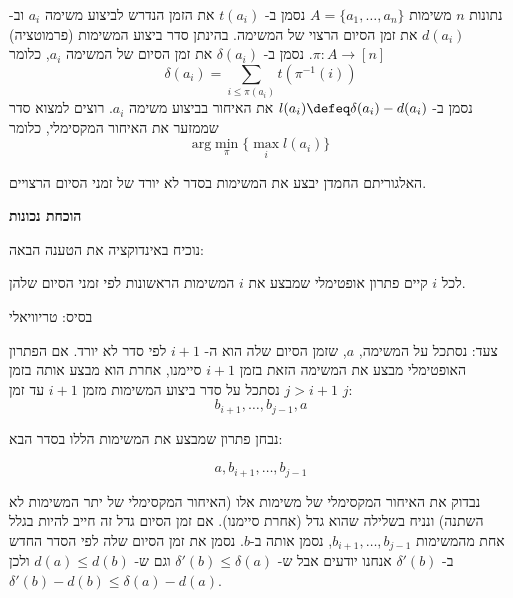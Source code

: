 נתונות $n$ משימות 
$A = \{a_1, \ldots, a_n\}$
נסמן ב-%
$t(a_i)$
את הזמן הנדרש לביצוע משימה 
$a_i$
וב-%
$d(a_i)$
את זמן הסיום הרצוי של המשימה.
בהינתן סדר ביצוע המשימות (פרמוטציה)
$\pi:A \to [n]$.
נסמן ב-%
$\delta(a_i)$
את זמן הסיום של המשימה 
$a_i$,
כלומר
$$\delta(a_i) = \sum_{i \leq \pi(a_i)} t(\pi^{-1}(i))$$
נסמן ב-%
$l(a_i) \defeq \delta(a_i) - d(a_i)$
את האיחור בביצוע משימה 
$a_i$.
רוצים למצוא סדר שממזער את האיחור המקסימלי, כלומר
$$
\text{arg}\min_\pi \{\max_i l(a_i)\}
$$

האלגוריתם החמדן יבצע את המשימות בסדר לא יורד של זמני הסיום הרצויים.

\textbf{הוכחת נכונות}

נוכיח באינדוקציה את הטענה הבאה:

לכל $i$ קיים פתרון אופטימלי שמבצע את $i$ המשימות הראשונות לפי זמני הסיום שלהן.

בסיס: טריוויאלי

צעד: נסתכל על המשימה, $a$, שזמן הסיום שלה הוא ה-%
$i+1$
לפי סדר לא יורד. 
אם הפתרון האופטימלי מבצע את המשימה הזאת בזמן 
$i + 1$
סיימנו, אחרת הוא מבצע אותה בזמן 
$j > i + 1$
נסתכל על סדר ביצוע המשימות מזמן 
$i + 1$
עד זמן 
$j$:
$$
b_{i + 1}, \ldots, b_{j - 1}, a
$$

נבחן פתרון שמבצע את המשימות הללו בסדר הבא:

$$
a, b_{i + 1}, \ldots, b_{j - 1}
$$

נבדוק את האיחור המקסימלי של משימות אלו (האיחור המקסימלי של יתר המשימות לא השתנה) 
ונניח בשלילה שהוא גדל (אחרת סיימנו). 
אם זמן הסיום גדל זה חייב להיות בגלל אחת מהמשימות 
$b_{i+1}, \ldots, b_{j - 1}$,
נסמן אותה ב-$b$. נסמן את זמן הסיום שלה לפי הסדר החדש ב-%
$\delta'(b)$
אנחנו יודעים אבל ש-%
$\delta'(b) \leq \delta(a)$
וגם ש-%
$d(a) \leq d(b)$
ולכן
$\delta'(b) - d(b) \leq \delta(a) - d(a)$.

